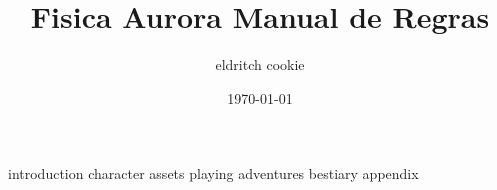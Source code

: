\documentclass[portuguese]{book}
\title{Fisica Aurora Manual de Regras}
\date{\today}
\author{eldritch cookie}
\begin{document}
\pagecolor{gray}
  \maketitle
  \newpage
  \tableofcontents
  {introduction}
  {character}
  {assets}
  {playing}
  {adventures}
  {bestiary}
  {appendix}
\end{document}
